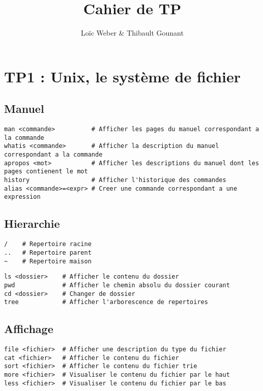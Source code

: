 \documentclass{article}
\author{Loïc Weber \& Thibault Gounant}
\title{Cahier de TP}
\begin{document}
\setlength\parindent{0pt}

\maketitle

\renewcommand*\contentsname{Table des matières}
\tableofcontents

\section{TP1 : Unix, le système de fichier}

\subsection{Manuel}
\begin{lstlisting}
man <commande>          # Afficher les pages du manuel correspondant a la commande
whatis <commande>       # Afficher la description du manuel correspondant a la commande
apropos <mot>           # Afficher les descriptions du manuel dont les pages contienent le mot 
history                 # Afficher l'historique des commandes
alias <commande>=<expr> # Creer une commande correspondant a une expression
\end{lstlisting}

\subsection{Hierarchie}
\begin{lstlisting}
/    # Repertoire racine
..   # Repertoire parent
~    # Repertoire maison
\end{lstlisting}

\begin{lstlisting}
ls <dossier>    # Afficher le contenu du dossier
pwd             # Afficher le chemin absolu du dossier courant
cd <dossier>    # Changer de dossier
tree            # Afficher l'arborescence de repertoires
\end{lstlisting}

\subsection{Affichage}
\begin{lstlisting}
file <fichier>  # Afficher une description du type du fichier
cat <fichier>   # Afficher le contenu du fichier
sort <fichier>  # Afficher le contenu du fichier trie
more <fichier>  # Visualiser le contenu du fichier par le haut
less <fichier>  # Visualiser le contenu du fichier par le bas
\end{lstlisting}
\end{document}
